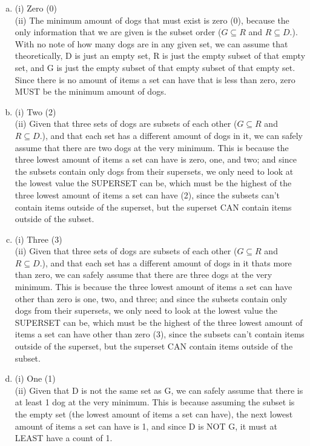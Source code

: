\documentclass[12pt]{article}
\begin{document}
	\begin{enumerate}[(a)]
		\item (i) Zero (0) \\
			(ii) The minimum amount of dogs that must exist is zero (0), because the
			only information that we are given is the subset order ($G \subseteq R$ and
			$R \subseteq D.$). With no note of how many dogs are in any given set, we
			can assume that theoretically, D is just an empty set, R is just the empty
			subset of that empty set, and G is just the empty subset of that empty subset
			of that empty set. Since there is no amount of items a set can have that
			is less than zero, zero MUST be the minimum amount of dogs.

		\item (i) Two (2) \\
			(ii) Given that three sets of dogs are subsets of each other ($G \subseteq
			R$
			and $R \subseteq D.$), and that each set has a different amount of dogs in
			it, we can safely assume that there are two dogs at the very minimum. This
			is because the three lowest amount of items a set can have is zero, one,
			and two; and since the subsets contain only dogs from their supersets, we
			only need to look at the lowest value the SUPERSET can be, which must be the
			highest of the three lowest amount of items a set can have (2), since the
			subsets can't contain items outside of the superset, but the superset CAN contain
			items outside of the subset.

		\item (i) Three (3) \\
			(ii) Given that three sets of dogs are subsets of each other ($G \subseteq
			R$
			and $R \subseteq D.$), and that each set has a different amount of dogs in
			it thats more than zero, we can safely assume that there are three dogs at
			the very minimum. This is because the three lowest amount of items a set
			can have other than zero is one, two, and three; and since the subsets contain
			only dogs from their supersets, we only need to look at the lowest value
			the SUPERSET can be, which must be the highest of the three lowest amount of
			items a set can have other than zero (3), since the subsets can't contain
			items outside of the superset, but the superset CAN contain items outside of
			the subset.

		\item (i) One (1) \\
			(ii) Given that D is not the same set as G, we can safely assume that
			there is at least 1 dog at the very minimum. This is because assuming the subset
			is the empty set (the lowest amount of items a set can have), the next
			lowest amount of items a set can have is 1, and since D is NOT G, it must
			at LEAST have a count of 1.
	\end{enumerate}
\end{document}
